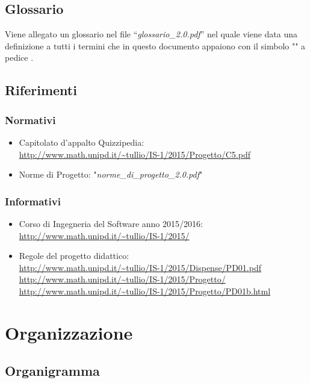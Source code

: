 \documentclass[a4paper,11pt]{article}
\begin{document}
	\subsection{Glossario}
	Viene allegato un glossario nel file ``\textit{glossario\_2.0.pdf}'' nel quale viene data una definizione a tutti i termini che in questo documento appaiono con il simbolo "\addglos" a pedice .
	\subsection{Riferimenti}
		\subsubsection{Normativi}
		\begin{itemize}
			\item Capitolato d'appalto Quizzipedia:\\
			\url{http://www.math.unipd.it/~tullio/IS-1/2015/Progetto/C5.pdf}
			\item Norme di Progetto: "\textit{norme\_di\_progetto\_2.0.pdf}"
		\end{itemize}
		\subsubsection{Informativi}
		\begin{itemize}
			\item Corso di Ingegneria del Software anno 2015/2016:\\
			\url{http://www.math.unipd.it/~tullio/IS-1/2015/}
			\item Regole del progetto didattico:\\
			\url{http://www.math.unipd.it/~tullio/IS-1/2015/Dispense/PD01.pdf}
			\url{http://www.math.unipd.it/~tullio/IS-1/2015/Progetto/}\\
			\url{http://www.math.unipd.it/~tullio/IS-1/2015/Progetto/PD01b.html}
		\end{itemize}
	\pagebreak
	
	\newpage
	\section{Organizzazione}	
	\subsection{Organigramma}
\end{document}
